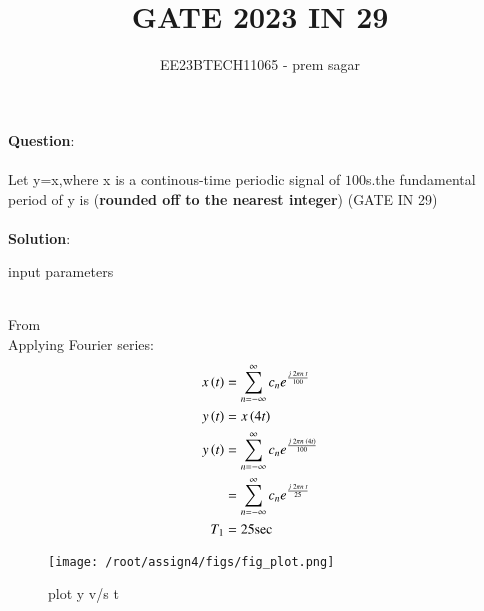 \documentclass[journal,12pt,twocolumn]{IEEEtran}
\theoremstyle{remark}
\begin{document}

\vspace{3cm}

\title{GATE 2023 IN 29}
\author{EE23BTECH11065 - prem sagar}
\maketitle
\newpage

\bigskip 

\renewcommand{\thefigure}{\theenumi}
\renewcommand{\thetable}{\theenumi}
\textbf{Question}:
\\\\Let y=x,where x is a continous-time periodic signal of $100$s.the fundamental period of y is (\textbf{rounded off to the nearest integer})
 \hfill(GATE IN 29)
 \\\\\textbf{Solution}:
\begin{table}[!ht]
\def\arraystretch{1.5}
   \centering
    \renewcommand\thetable{1}
      
    \caption{input parameters}
    \label{tab:IN 29}
 \end{table}
\\From {}
\\Applying Fourier series:
 \begin{align}
 x\left(t\right)&=\sum_{n=-\infty}^{\infty}c_ne^\frac{j\;2\pi n\;t}{100}
\\ y\left(t\right)&=x\left(4t\right)
\\ y\left(t\right)&=\sum_{n=-\infty}^{\infty}c_ne^\frac{j\;2\pi n\;\left(4t\right)}{100}
\\&=\sum_{n=-\infty}^{\infty}c_ne^\frac{j\;2\pi n\;t}{25}
\\T_1&=25\text{sec}
 \end{align}
\begin{figure}[h]
 \renewcommand\thefigure{1}
    \centering
    \texttt{[image: /root/assign4/figs/fig\_plot.png]}
    \caption{plot y v/s t}
    \label{fig:enter-label}
\end{figure}
\end{document}
